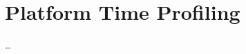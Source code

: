 \section{Platform Time Profiling}
\label{sec:methodologyexperiment_platformtimeprofiling}
\ldots



